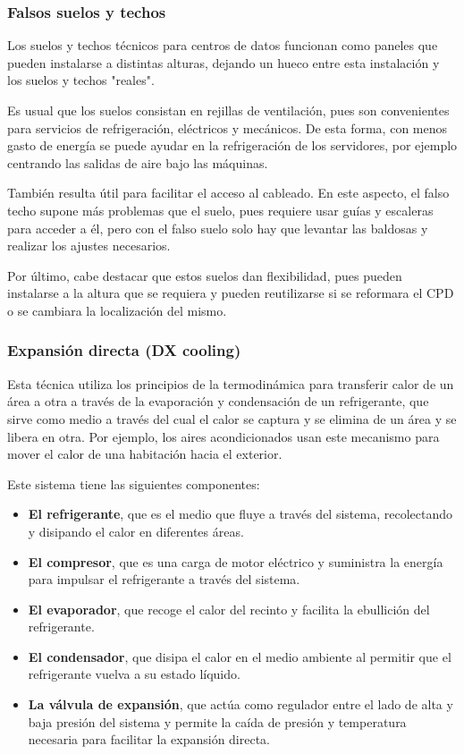 \subsubsection{Falsos suelos y techos} \label{suelos-techos}

Los suelos y techos técnicos para centros de datos funcionan como paneles que pueden instalarse a distintas alturas, dejando un hueco entre esta instalación y los suelos y techos "reales".

Es usual que los suelos consistan en rejillas de ventilación, pues son convenientes para servicios de refrigeración, eléctricos y mecánicos. De esta forma, con menos gasto de energía se puede ayudar en la refrigeración de los servidores, por ejemplo centrando las salidas de aire bajo las máquinas.

También resulta útil para facilitar el acceso al cableado. En este aspecto, el falso techo supone más problemas que el suelo, pues requiere usar guías y escaleras para acceder a él, pero con el falso suelo solo hay que levantar las baldosas y realizar los ajustes necesarios.

Por último, cabe destacar que estos suelos dan flexibilidad, pues pueden instalarse a la altura que se requiera y pueden reutilizarse si se reformara el CPD o se cambiara la localización del mismo.

\subsubsection{Expansión directa (DX cooling)}

Esta técnica utiliza los principios de la termodinámica para transferir calor de un área a otra a través de la evaporación y condensación de un refrigerante, que sirve como medio a través del cual el calor se captura y se elimina de un área y se libera en otra. Por ejemplo, los aires acondicionados usan este mecanismo para mover el calor de una habitación hacia el exterior.

Este sistema tiene las siguientes componentes:

\begin{itemize}
    \item {\textbf{El refrigerante}}, que es el medio que fluye a través del sistema, recolectando y disipando el calor en diferentes áreas.
    \item \textbf{El compresor}, que es una carga de motor eléctrico y suministra la energía para impulsar el refrigerante a través del sistema.
    \item \textbf{El evaporador}, que recoge el calor del recinto y facilita la ebullición del refrigerante.
    \item \textbf{El condensador}, que disipa el calor en el medio ambiente al permitir que el refrigerante vuelva a su estado líquido.
    \item \textbf{La válvula de expansión}, que actúa como regulador entre el lado de alta y baja presión del sistema y permite la caída de presión y temperatura necesaria para facilitar la expansión directa.
\end{itemize}



